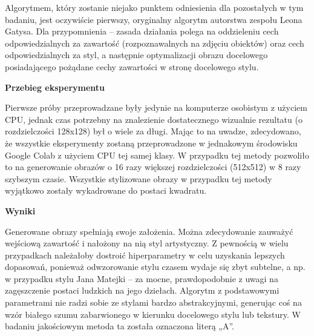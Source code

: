 \documentclass[12pt]{article}
\begin{document}
Algorytmem, który zostanie niejako punktem odniesienia dla pozostałych w tym badaniu, jest oczywiście pierwszy, oryginalny algorytm autorstwa zespołu Leona Gatysa. Dla przypomnienia – zasada działania polega na oddzieleniu cech odpowiedzialnych za zawartość (rozpoznawalnych na zdjęciu obiektów) oraz cech odpowiedzialnych za styl, a następnie optymalizacji obrazu docelowego posiadającego pożądane cechy zawartości w stronę docelowego stylu.

\noindent\textbf{Przebieg eksperymentu}

Pierwsze próby przeprowadzane były jedynie na komputerze osobistym z użyciem CPU, jednak czas potrzebny na znalezienie dostatecznego wizualnie rezultatu (o rozdzielczości 128x128) był o wiele za długi. Mając to na uwadze, zdecydowano, że wszystkie eksperymenty zostaną przeprowadzone w jednakowym środowisku Google Colab z użyciem CPU tej samej klasy. W przypadku tej metody pozwoliło to na generowanie obrazów o 16 razy większej rozdzielczości (512x512) w 8 razy szybszym czasie. Wszystkie stylizowane obrazy w przypadku tej metody wyjątkowo zostały wykadrowane do postaci kwadratu.

\noindent\textbf{Wyniki}

Generowane obrazy spełniają swoje założenia. Można zdecydowanie zauważyć wejściową zawartość i nałożony na nią styl artystyczny. Z pewnością w wielu przypadkach należałoby dostroić hiperparametry w celu uzyskania lepszych dopasowań, ponieważ odwzorowanie stylu czasem wydaje się zbyt subtelne, a np. w przypadku stylu Jana Matejki – za mocne, prawdopodobnie z uwagi na zagęszczenie postaci ludzkich na jego dziełach. Algorytm z podstawowymi parametrami nie radzi sobie ze stylami bardzo abstrakcyjnymi, generując coś na wzór białego szumu zabarwionego w kierunku docelowego stylu lub tekstury. W badaniu jakościowym metoda ta została oznaczona literą „A”.
\end{document}
